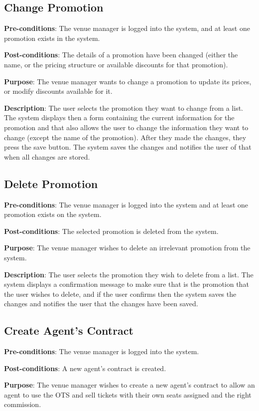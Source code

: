 \subsection{Change Promotion}
\textbf{Pre-conditions}: The venue manager is logged into the system,
and at least one promotion exists in the system.

\textbf{Post-conditions}: The details of a promotion have been changed
(either the name, or the pricing structure or available discounts
for that promotion).

\textbf{Purpose}: The venue manager wants to change a promotion to
update its prices, or modify discounts available for it.

\textbf{Description}: The user selects the promotion they want to
change from a list. The system displays then a form containing the
current information for the promotion and that also allows the user
to change the information they want to change (except the name of
the promotion). After they made the changes, they press the save
button. The system saves the changes and notifies the user of that
when all changes are stored.

\subsection{Delete Promotion}
\textbf{Pre-conditions}: The venue manager is logged into the system
and at least one promotion exists on the system.

\textbf{Post-conditions}: The selected promotion is deleted from the
system.

\textbf{Purpose}: The venue manager wishes to delete an irrelevant
promotion from the system.

\textbf{Description}: The user selects the promotion they wish to
delete from a list. The system displays a confirmation message
to make sure that is the promotion that the user wishes to delete,
and if the user confirms then the system saves the changes and
notifies the user that the changes have been saved.

\subsection{Create Agent's Contract}
\textbf{Pre-conditions}: The venue manager is logged into the system.

\textbf{Post-conditions}: A new agent's contract is created.

\textbf{Purpose}: The venue manager wishes to create a new agent's
contract to allow an agent to use the OTS and sell tickets with their own
seats assigned and the right commission.

